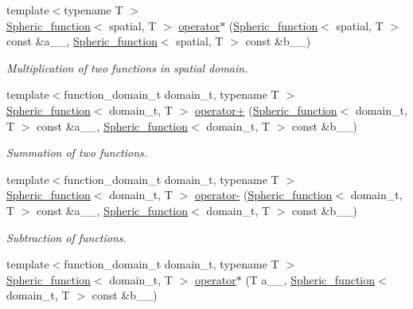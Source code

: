 \begin{DoxyCompactItemize}
\item 
{\footnotesize template$<$typename T $>$ }\\\hyperlink{classsirius_1_1_spheric__function}{Spheric\+\_\+function}$<$ spatial, T $>$ \hyperlink{namespacesirius_a4c50394ad40cc095bb6b564e33e9579c}{operator$\ast$} (\hyperlink{classsirius_1_1_spheric__function}{Spheric\+\_\+function}$<$ spatial, T $>$ const \&a\+\_\+\+\_\+, \hyperlink{classsirius_1_1_spheric__function}{Spheric\+\_\+function}$<$ spatial, T $>$ const \&b\+\_\+\+\_\+)
\begin{DoxyCompactList}\small\item\em Multiplication of two functions in spatial domain. \end{DoxyCompactList}\item 
{\footnotesize template$<$function\+\_\+domain\+\_\+t domain\+\_\+t, typename T $>$ }\\\hyperlink{classsirius_1_1_spheric__function}{Spheric\+\_\+function}$<$ domain\+\_\+t, T $>$ \hyperlink{namespacesirius_ad8768ef10d519c196291f485d2083404}{operator+} (\hyperlink{classsirius_1_1_spheric__function}{Spheric\+\_\+function}$<$ domain\+\_\+t, T $>$ const \&a\+\_\+\+\_\+, \hyperlink{classsirius_1_1_spheric__function}{Spheric\+\_\+function}$<$ domain\+\_\+t, T $>$ const \&b\+\_\+\+\_\+)
\begin{DoxyCompactList}\small\item\em Summation of two functions. \end{DoxyCompactList}\item 
{\footnotesize template$<$function\+\_\+domain\+\_\+t domain\+\_\+t, typename T $>$ }\\\hyperlink{classsirius_1_1_spheric__function}{Spheric\+\_\+function}$<$ domain\+\_\+t, T $>$ \hyperlink{namespacesirius_afca585c2b478aa2edd384d71fb727557}{operator-\/} (\hyperlink{classsirius_1_1_spheric__function}{Spheric\+\_\+function}$<$ domain\+\_\+t, T $>$ const \&a\+\_\+\+\_\+, \hyperlink{classsirius_1_1_spheric__function}{Spheric\+\_\+function}$<$ domain\+\_\+t, T $>$ const \&b\+\_\+\+\_\+)
\begin{DoxyCompactList}\small\item\em Subtraction of functions. \end{DoxyCompactList}\item 
{\footnotesize template$<$function\+\_\+domain\+\_\+t domain\+\_\+t, typename T $>$ }\\\hyperlink{classsirius_1_1_spheric__function}{Spheric\+\_\+function}$<$ domain\+\_\+t, T $>$ \hyperlink{namespacesirius_a2d71ee1c856cf9033846250dd362dbed}{operator$\ast$} (T a\+\_\+\+\_\+, \hyperlink{classsirius_1_1_spheric__function}{Spheric\+\_\+function}$<$ domain\+\_\+t, T $>$ const \&b\+\_\+\+\_\+)

\end{DoxyCompactItemize}
